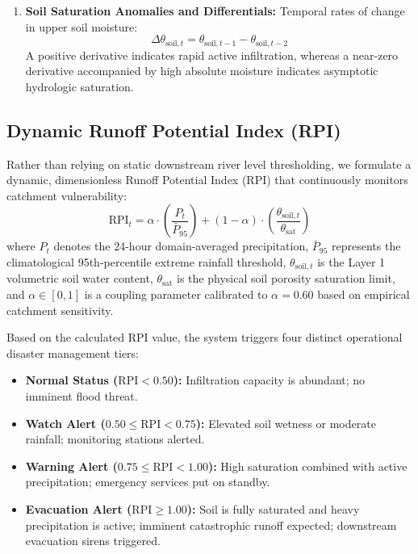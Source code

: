 \documentclass[journal]{IEEEtran}
\begin{document}
\begin{enumerate}
\begin{equation}
    \text{Max}_{W, t} = \max_{i \in \{1, \dots, W\}} P_{t-i}
    \end{equation}
    This feature enables the models to distinguish between continuous low-intensity drizzle and a sharp, high-energy convective cloudburst embedded within a rainy week.
    \item \textbf{Soil Saturation Anomalies and Differentials:} Temporal rates of change in upper soil moisture:
    \begin{equation}
    \Delta \theta_{\text{soil}, t} = \theta_{\text{soil}, t-1} - \theta_{\text{soil}, t-2}
    \end{equation}
    A positive derivative indicates rapid active infiltration, whereas a near-zero derivative accompanied by high absolute moisture indicates asymptotic hydrologic saturation.
\end{enumerate}

\subsection{Dynamic Runoff Potential Index (RPI)}
Rather than relying on static downstream river level thresholding, we formulate a dynamic, dimensionless Runoff Potential Index (RPI) that continuously monitors catchment vulnerability:
\begin{equation}
\text{RPI}_t = \alpha \cdot \left(\frac{P_{t}}{\bar{P}_{95}}\right) + (1 - \alpha) \cdot \left(\frac{\theta_{\text{soil}, t}}{\theta_{\text{sat}}}\right)
\label{eq:rpi}
\end{equation}
where $P_t$ denotes the 24-hour domain-averaged precipitation, $\bar{P}_{95}$ represents the climatological 95th-percentile extreme rainfall threshold, $\theta_{\text{soil}, t}$ is the Layer 1 volumetric soil water content, $\theta_{\text{sat}}$ is the physical soil porosity saturation limit, and $\alpha \in [0, 1]$ is a coupling parameter calibrated to $\alpha = 0.60$ based on empirical catchment sensitivity.

Based on the calculated RPI value, the system triggers four distinct operational disaster management tiers:
\begin{itemize}
    \item \textbf{Normal Status ($\text{RPI} < 0.50$):} Infiltration capacity is abundant; no imminent flood threat.
    \item \textbf{Watch Alert ($0.50 \le \text{RPI} < 0.75$):} Elevated soil wetness or moderate rainfall; monitoring stations alerted.
    \item \textbf{Warning Alert ($0.75 \le \text{RPI} < 1.00$):} High saturation combined with active precipitation; emergency services put on standby.
    \item \textbf{Evacuation Alert ($\text{RPI} \ge 1.00$):} Soil is fully saturated and heavy precipitation is active; imminent catastrophic runoff expected; downstream evacuation sirens triggered.
\end{itemize}
\end{document}
